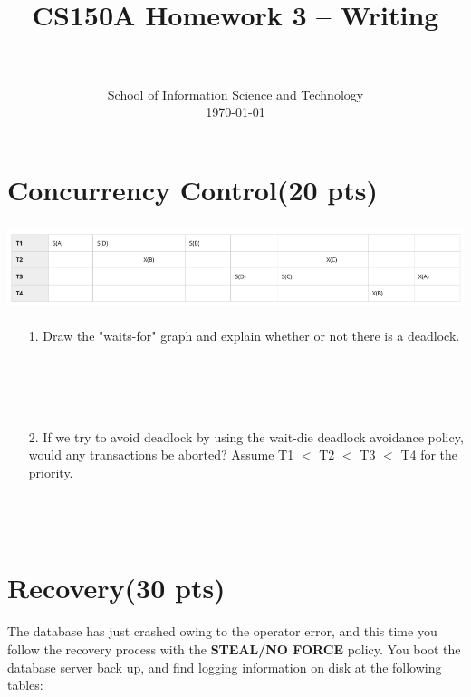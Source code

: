 \documentclass[paper=a4, fontsize=11pt]{scrartcl}
\title{
	\usefont{OT1}{bch}{b}{n}
	\horrule{0.5pt} \\[0.4cm]
	\huge CS150A Homework 3 -- Writing \\
	\horrule{2pt} \\[0.5cm]
}
\author{
	\normalfont 								\normalsize
	School of Information Science and Technology \\
	[-3pt]		\normalsize
	\today
}
\date{}
\numberwithin{equation}{section}		%
\numberwithin{figure}{section}			%
\numberwithin{table}{section}				%
\begin{document}
\maketitle
\section{Concurrency Control(20 pts)}

\includegraphics[height=2.5cm]{deadlock.png}
\begin{itemize}
        \item [1.] Draw the "waits-for" graph and explain whether or not there is a deadlock. \\~\\~\\~\\~\\
\item [2.] If we try to avoid deadlock by using the wait-die deadlock avoidance policy, would any transactions be aborted? Assume T1 $<$ T2 $<$ T3 $<$ T4 for the priority.\\~\\~\\~\\
\end{itemize}

\section{Recovery(30 pts)}
The database has just crashed owing to the operator error, and this time you follow the recovery process with the \textbf{STEAL/NO FORCE} policy. You boot the database server back up, and find logging information on disk at the following tables:\\
\end{document}
